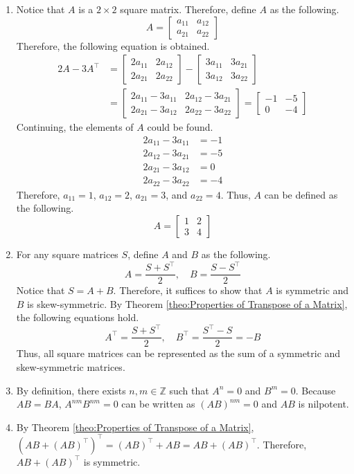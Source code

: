 \documentclass[../main.tex]{subfiles}
\begin{document}
\begin{enumerate}
\item
Notice that $A$ is a $2 \times 2$ square matrix. Therefore, define
$A$ as the following.
\[
A =
\begin{bmatrix}
    a_{11} & a_{12} \\
    a_{21} & a_{22}
\end{bmatrix}
\]
Therefore, the following equation is obtained.
\begin{align*}
2A - 3A^\intercal
&=
\begin{bmatrix}
    2a_{11} & 2a_{12} \\
    2a_{21} & 2a_{22}
\end{bmatrix}
-
\begin{bmatrix}
    3a_{11} & 3a_{21} \\
    3a_{12} & 3a_{22}
\end{bmatrix} \\
&=
\begin{bmatrix}
    2a_{11} - 3a_{11} & 2a_{12} - 3a_{21} \\
    2a_{21} - 3a_{12} & 2a_{22} - 3a_{22}
\end{bmatrix}
=
\begin{bmatrix}
    -1 & -5 \\
    0  & -4
\end{bmatrix}
\end{align*}
Continuing, the elements of $A$ could be found.
\begin{align*}
    2a_{11} - 3a_{11} &= -1 \\
    2a_{12} - 3a_{21} &= -5 \\
    2a_{21} - 3a_{12} &= 0  \\
    2a_{22} - 3a_{22} &= -4
\end{align*}
Therefore, $a_{11} = 1$, $a_{12} = 2$, $a_{21} = 3$, and $a_{22} = 4$.
Thus, $A$ can be defined as the following.
\[
A =
\begin{bmatrix}
    1 & 2 \\
    3 & 4
\end{bmatrix}
\]

\item
For any square matrices $S$, define $A$ and $B$ as the following.
\[
A = \frac{S + S^\intercal}{2}, \quad
B = \frac{S - S^\intercal}{2}
\]
Notice that $S = A + B$. Therefore, it suffices to show that $A$ is
symmetric and $B$ is skew-symmetric. By Theorem \ref{theo:Properties
of Transpose of a Matrix}, the following equations hold.
\[
A^\intercal
= \frac{S + S^\intercal}{2}, \quad
B^\intercal
= \frac{S^\intercal - S}{2}
= -B
\]
Thus, all square matrices can be represented as the sum of a symmetric
and skew-symmetric matrices.

\item
By definition, there exists $n, m \in \mathbb{Z}$ such that
$A^n = 0$ and $B^m = 0$. Because $AB = BA$, $A^{nm} B^{nm} = 0$ can
be written as $(AB)^{nm} = 0$ and $AB$ is nilpotent.

\item
By Theorem \ref{theo:Properties of Transpose of a Matrix}, $(AB +
(AB)^\intercal)^\intercal = (AB)^\intercal + AB = AB +
(AB)^\intercal$. Therefore, $AB + (AB)^\intercal$ is symmetric.
\end{enumerate}
\end{document}
